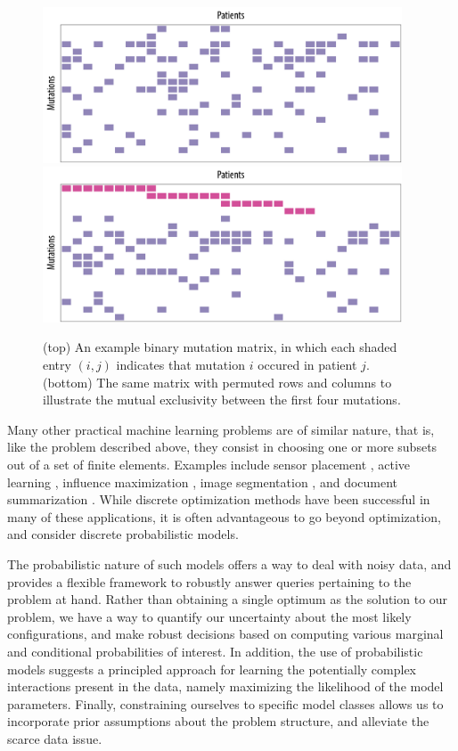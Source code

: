 \begin{figure}[tb]
\centering
\includegraphics[width=0.95\textwidth]{figures/intro/example1.pdf}\\[1em]
\includegraphics[width=0.95\textwidth]{figures/intro/example1_rep.pdf}\\[1em]
\caption{
(top) An example binary mutation matrix, in which each shaded entry $(i, j)$ indicates that mutation $i$ occured in patient $j$.
(bottom) The same matrix with permuted rows and columns to illustrate the mutual exclusivity between the first four mutations.
}
\label{fig:bamat}
\end{figure}

Many other practical machine learning problems are of similar nature, that is, like the problem described above, they consist in choosing one or more subsets out of a set of finite elements.
Examples include sensor placement \citep{krause06}, active learning \citep{golovin11}, influence maximization \citep{kempe03}, image segmentation \citep{jegelka11}, and document summarization \citep{lin11}.
While discrete optimization methods have been successful in many of these applications, it is often advantageous to go beyond optimization, and consider discrete probabilistic models.

The probabilistic nature of such models offers a way to deal with noisy data, and provides a flexible framework to robustly answer queries pertaining to the problem at hand.
Rather than obtaining a single optimum as the solution to our problem, we have a way to quantify our uncertainty about the most likely configurations, and make robust decisions based on computing various marginal and conditional probabilities of interest.
In addition, the use of probabilistic models suggests a principled approach for learning the potentially complex interactions present in the data, namely maximizing the likelihood of the model parameters.
Finally, constraining ourselves to specific model classes allows us to incorporate prior assumptions about the problem structure, and alleviate the scarce data issue.

